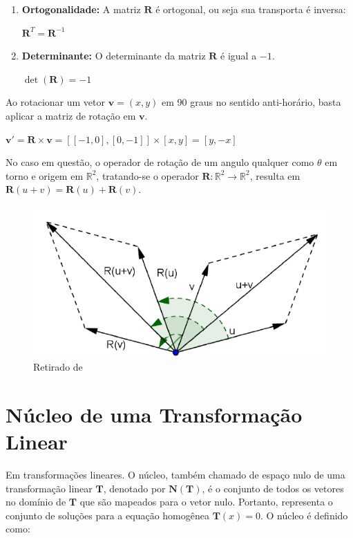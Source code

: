 \begin{enumerate}
	\item \textbf{Ortogonalidade:} A matriz $\mathbf{R}$ é ortogonal, ou seja sua transporta é inversa:
	
	\centerline{$\mathbf{R}^T = \mathbf{R}^{-1}$}
	\item \textbf{Determinante:} O determinante da matriz $\mathbf{R}$ é igual a $-1$.
	
	\centerline{$\det(\mathbf{R}) = -1$}
\end{enumerate}

Ao rotacionar um vetor $\mathbf{v} = (x, y)$ em 90 graus  no sentido anti-horário, basta aplicar a matriz de rotação em $\mathbf{v}$.

\centerline{$\mathbf{v}' = \mathbf{R} \times \mathbf{v} = [[-1, 0], [0, -1]] \times [x, y] = [y, -x]$}

No caso em questão, o operador de rotação de um angulo qualquer como $\theta$ em torno e origem em $\mathbb{R}^2$, tratando-se o operador $\mathbf{R}: \mathbb{R}^2 \longrightarrow \mathbb{R}^2$, resulta em $\mathbf{R}(u + v) = \mathbf{R}(u) + \mathbf{R}(v)$.

\begin{figure}[H]
	\centering
	\includegraphics[scale=1.00]{t_rotacao.png}
	\caption{Retirado de \cite{nogueira2013}}
\end{figure}

\section{Núcleo de uma Transformação Linear}
Em transformações lineares. O núcleo, também chamado de espaço nulo de uma transformação linear $\mathbf{T}$, denotado por  $\mathbf{N}(\mathbf{T})$, é o conjunto de todos os vetores no domínio de $\mathbf{T}$ que são mapeados para o vetor nulo. Portanto, representa o conjunto de soluções para a equação homogênea $\mathbf{T}(x) = 0$. O núcleo é definido como:

